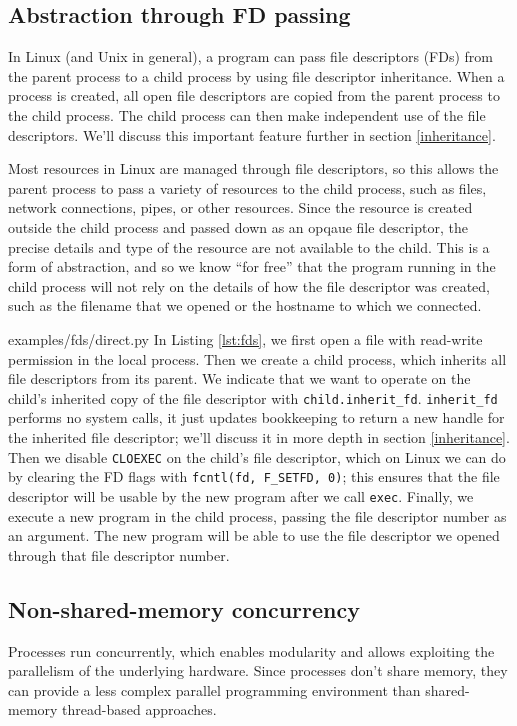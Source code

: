 \documentclass[letterpaper,twocolumn,10pt]{article}
\begin{document}
\subsection{Abstraction through FD passing}\label{fd_abstraction}
In Linux (and Unix in general),
a program can pass file descriptors (FDs) from the parent process to a child process
by using file descriptor inheritance\cite{tlpi}.
When a process is created, all open file descriptors are copied from the parent process to the child process.
The child process can then make independent use of the file descriptors.
We'll discuss this important feature further in section \ref{inheritance}.

Most resources in Linux are managed through file descriptors,
so this allows the parent process to pass a variety of resources to the child process,
such as files, network connections, pipes, or other resources\cite{ucspi}.
Since the resource is created outside the child process and passed down as an opqaue file descriptor,
the precise details and type of the resource are not available to the child.
This is a form of abstraction,
and so we know ``for free''\cite{theoremsforfree}
that the program running in the child process
will not rely on the details of how the file descriptor was created,
such as the filename that we opened or the hostname to which we connected.


{examples/fds/direct.py}
In Listing \ref{lst:fds},
we first open a file with read-write permission in the local process.
Then we create a child process,
which inherits all file descriptors from its parent.
We indicate that we want to operate on the child's inherited copy of the file descriptor with \verb|child.inherit_fd|.
\texttt{inherit\_fd} performs no system calls,
it just updates bookkeeping to return a new handle for the inherited file descriptor;
we'll discuss it in more depth in section \ref{inheritance}.
Then we disable \texttt{CLOEXEC} on the child's file descriptor,
which on Linux we can do by clearing the FD flags with \verb|fcntl(fd, F_SETFD, 0)|;
this ensures that the file descriptor will be usable by the new program after we call \texttt{exec}\cite{fcntl}.
Finally, we execute a new program in the child process,
passing the file descriptor number as an argument.
The new program will be able to use the file descriptor we opened through that file descriptor number.
\subsection{Non-shared-memory concurrency}\label{pipe}
Processes run concurrently,
which enables modularity
and allows exploiting the parallelism of the underlying hardware.
Since processes don't share memory,
they can provide a less complex parallel programming environment
than shared-memory thread-based approaches\cite{threads}.
\end{document}

